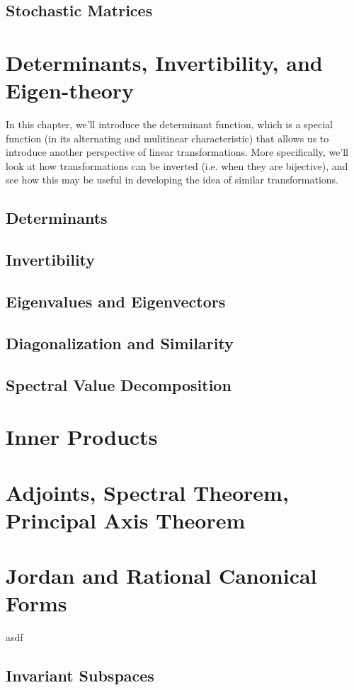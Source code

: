 \documentclass[11pt]{report}
\begin{document}
\section{Stochastic Matrices}


\chapter{Determinants, Invertibility, and Eigen-theory}
In this chapter, we'll introduce the determinant function, which is a special function (in its alternating and mulitinear characteristic) that allows us to introduce another perspective of linear transformations. More specifically, we'll look at how transformations can be inverted (i.e. when they are bijective), and see how this may be useful in developing the idea of similar transformations.
\section{Determinants}
\section{Invertibility}
\section{Eigenvalues and Eigenvectors}
\section{Diagonalization and Similarity}
\section{Spectral Value Decomposition}


\chapter{Inner Products}


\chapter{Adjoints, Spectral Theorem, Principal Axis Theorem}


\chapter{Jordan and Rational Canonical Forms}
asdf
\section{Invariant Subspaces}
\end{document}
